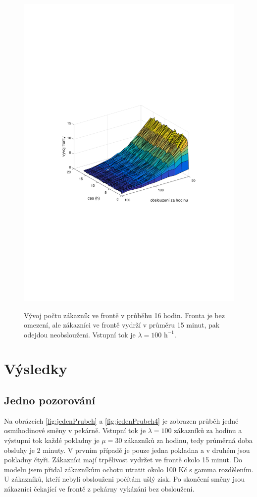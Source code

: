 \documentclass[a4paper,12pt]{article}
\begin{document}
\begin{figure}
\centering
\includegraphics[width=0.8\columnwidth]{frontaTimeout.pdf}
\label{fig:frontaTO}
\caption{Vývoj počtu zákazník ve frontě v průběhu 16 hodin. Fronta je bez omezení, ale zákazníci ve frontě 
vydrží v průměru 15 minut, pak odejdou neobslouženi. Vstupní tok je \(\lambda = 100 \mbox{~h}^{-1}\). }
\end{figure}

\section{Výsledky}
\subsection{Jedno pozorování}
Na obrázcích \ref{fig:jedenPrubeh} a \ref{fig:jedenPrubeh4} je zobrazen průběh jedné osmihodinové směny v pekárně. 
Vstupní tok je \(\lambda = 100\) zákazníků za hodinu a výstupní tok každé pokladny je \(\mu = 30\) zákazníků za hodinu, 
tedy průměrná doba obsluhy je 2 minuty. V prvním případě je pouze jedna pokladna a v druhém jsou pokladny čtyři. 
Zákazníci mají trpělivost vydržet ve frontě okolo 15 minut. 
Do modelu jsem přidal zákazníkům ochotu utratit okolo 100 Kč s gamma rozdělením. U zákazníků, kteří nebyli obslouženi počítám 
ušlý zisk. Po skončení směny jsou zákazníci čekající ve frontě z pekárny vykázáni bez obsloužení. 
\end{document}
